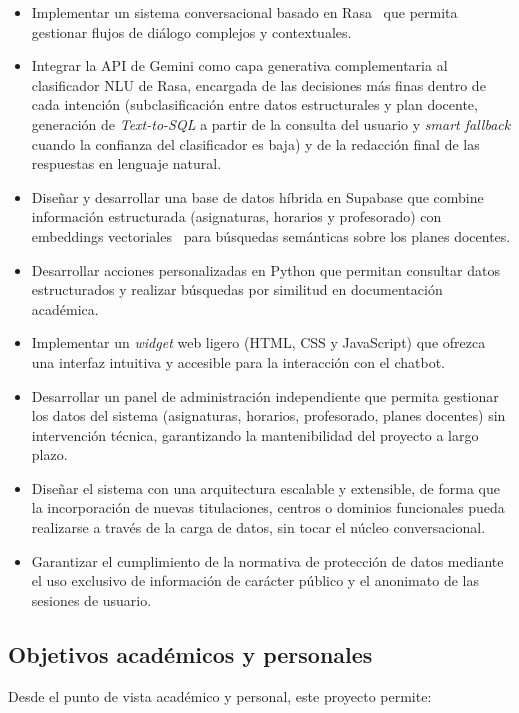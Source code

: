 \begin{itemize}
    \item Implementar un sistema conversacional basado en Rasa~\cite{bocklisch2017rasa} que permita gestionar flujos de diálogo complejos y contextuales.
    \item Integrar la API de Gemini como capa generativa complementaria al clasificador NLU de Rasa, encargada de las decisiones más finas dentro de cada intención (subclasificación entre datos estructurales y plan docente, generación de \textit{Text-to-SQL} a partir de la consulta del usuario y \textit{smart fallback} cuando la confianza del clasificador es baja) y de la redacción final de las respuestas en lenguaje natural.
    \item Diseñar y desarrollar una base de datos híbrida en Supabase que combine información estructurada (asignaturas, horarios y profesorado) con embeddings vectoriales~\cite{karpukhin2020dpr} para búsquedas semánticas sobre los planes docentes.
    \item Desarrollar acciones personalizadas en Python que permitan consultar datos estructurados y realizar búsquedas por similitud en documentación académica.
    \item Implementar un \textit{widget} web ligero (HTML, CSS y JavaScript) que ofrezca una interfaz intuitiva y accesible para la interacción con el chatbot.
    \item Desarrollar un panel de administración independiente que permita gestionar los datos del sistema (asignaturas, horarios, profesorado, planes docentes) sin intervención técnica, garantizando la mantenibilidad del proyecto a largo plazo.
    \item Diseñar el sistema con una arquitectura escalable y extensible, de forma que la incorporación de nuevas titulaciones, centros o dominios funcionales pueda realizarse a través de la carga de datos, sin tocar el núcleo conversacional.
    \item Garantizar el cumplimiento de la normativa de protección de datos mediante el uso exclusivo de información de carácter público y el anonimato de las sesiones de usuario.
\end{itemize}

\subsection{Objetivos académicos y personales}
\label{subsec:objetivos-academicos}

Desde el punto de vista académico y personal, este proyecto permite:

